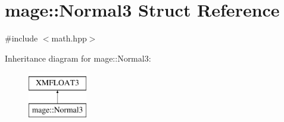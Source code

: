 \hypertarget{structmage_1_1_normal3}{}\section{mage\+:\+:Normal3 Struct Reference}
\label{structmage_1_1_normal3}


{\ttfamily \#include $<$math.\+hpp$>$}

Inheritance diagram for mage\+:\+:Normal3\+:\begin{figure}[H]
\begin{center}
\leavevmode
\includegraphics[height=2.000000cm]{structmage_1_1_normal3}
\end{center}
\end{figure}
